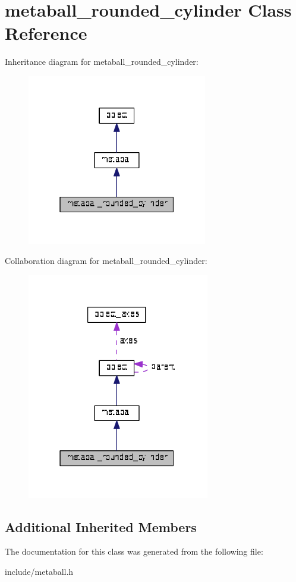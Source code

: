 \hypertarget{classmetaball__rounded__cylinder}{}\section{metaball\+\_\+rounded\+\_\+cylinder Class Reference}
\label{classmetaball__rounded__cylinder}


Inheritance diagram for metaball\+\_\+rounded\+\_\+cylinder\+:\nopagebreak
\begin{figure}[H]
\begin{center}
\leavevmode
\includegraphics[width=223pt]{classmetaball__rounded__cylinder__inherit__graph}
\end{center}
\end{figure}


Collaboration diagram for metaball\+\_\+rounded\+\_\+cylinder\+:\nopagebreak
\begin{figure}[H]
\begin{center}
\leavevmode
\includegraphics[width=226pt]{classmetaball__rounded__cylinder__coll__graph}
\end{center}
\end{figure}
\subsection*{Additional Inherited Members}


The documentation for this class was generated from the following file\+:\begin{DoxyCompactItemize}
\item 
include/metaball.\+h\end{DoxyCompactItemize}
